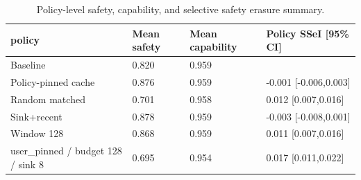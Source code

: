\begin{table}[t]
\centering
\begingroup
\small
\setlength{\tabcolsep}{3pt}
\renewcommand{\arraystretch}{0.94}
\begin{tabularx}{\linewidth}{@{}lXXX@{}}
\toprule
policy & Mean safety & Mean capability & Policy SSeI [95\% CI] \\
\midrule
Baseline & 0.820 & 0.959 &  \\
Policy-pinned cache & 0.876 & 0.959 & -0.001 [-0.006,0.003] \\
Random matched & 0.701 & 0.958 & 0.012 [0.007,0.016] \\
Sink+recent & 0.878 & 0.959 & -0.003 [-0.008,0.001] \\
Window 128 & 0.868 & 0.959 & 0.011 [0.007,0.016] \\
user\_pinned / budget 128 / sink 8 & 0.695 & 0.954 & 0.017 [0.011,0.022] \\
\bottomrule
\end{tabularx}
\endgroup
\caption{Policy-level safety, capability, and selective safety erasure summary.}
\label{tab:main-results}
\end{table}
